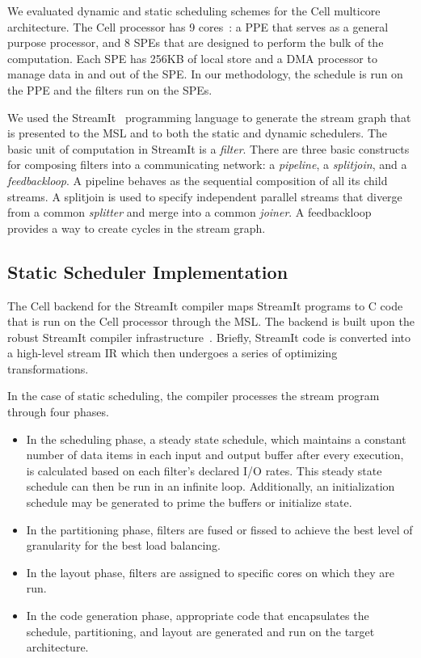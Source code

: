 We evaluated dynamic and static scheduling schemes for the Cell
multicore architecture. The Cell processor has 9
cores~\cite{Cell-hpca}: a PPE that serves as a general purpose
processor, and 8 SPEs that are designed to perform the bulk of the
computation. Each SPE has 256KB of local store and a DMA processor to
manage data in and out of the SPE. In our methodology, the schedule is
run on the PPE and the filters run on the SPEs.

We used the StreamIt~\cite{streamitweb} programming language to
generate the stream graph that is presented to the MSL and to both the
static and dynamic schedulers. The basic unit of computation in StreamIt is a 
{\it filter}. There are three basic constructs for composing filters
into a communicating network: a {\it pipeline}, a {\it splitjoin}, and
a {\it feedbackloop}. A pipeline behaves as the sequential composition
of all its child streams. A splitjoin is used to specify independent
parallel streams that diverge from a common {\it splitter} and merge
into a common {\it joiner}. A feedbackloop provides a way to create
cycles in the stream graph.

\subsection{Static Scheduler Implementation}

The Cell backend for the StreamIt compiler maps StreamIt programs to C code that
is run on the Cell processor through the MSL. The backend 
is built upon the robust StreamIt compiler infrastructure~\cite{asplos06}. 
Briefly, StreamIt code is converted into a
high-level stream IR which then undergoes a series of optimizing transformations.

In the case of static scheduling, the compiler processes the stream program
through four phases.
\begin{itemize}
\item In the scheduling phase, a steady state schedule, which maintains a constant
number of data items in each input and output buffer after every execution, is calculated based on each
filter's declared I/O rates. This steady state schedule can then
be run in an infinite loop. Additionally, an initialization schedule may be
generated to prime the buffers or initialize state.
\item In the partitioning phase, filters are fused or
fissed to achieve the best level of granularity for the best load balancing.
\item In the layout phase, filters are assigned to specific cores on which
they are run.
\item In the code generation phase, appropriate code that encapsulates the schedule,
partitioning, and layout are generated and run on the target architecture.
\end{itemize}

